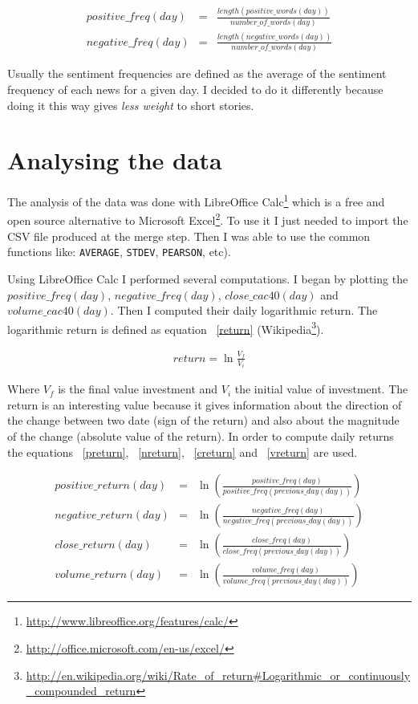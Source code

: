 \documentclass[12pt]{report}
\begin{document}
\begin{eqnarray}
	positive\_freq(day) &=& \frac{length(positive\_words(day))}{number\_of\_words(day)}\label{pfreq}\\
			 negative\_freq(day) &=& \frac{length(negative\_words(day))}{number\_of\_words(day)}\label{nfreq}
\end{eqnarray}

Usually the sentiment frequencies are defined as the average of the sentiment frequency of each news for a given day. I decided to do it differently because doing it this way gives \emph{less weight} to short stories.

\section{Analysing the data}

The analysis of the data was done with LibreOffice Calc\footnote{\url{http://www.libreoffice.org/features/calc/}} which is a free and open source alternative to Microsoft Excel\footnote{\url{http://office.microsoft.com/en-us/excel/}}. To use it I just needed to import the  CSV file produced at the merge step. Then I was able to use the common functions like: \lstinline!AVERAGE!, \lstinline!STDEV!, \lstinline!PEARSON!, etc).

Using LibreOffice Calc I performed several computations. I began by plotting the $positive\_freq(day)$, $negative\_freq(day)$, $close\_cac40(day)$ and $volume\_cac40(day)$. Then I computed their daily logarithmic return. The logarithmic return is defined as equation ~\ref{return}  (Wikipedia\footnote{\url{http://en.wikipedia.org/wiki/Rate_of_return\#Logarithmic_or_continuously_compounded_return}}).

\begin{eqnarray}
	return = \ln\frac{V_f}{V_i}\label{return}
\end{eqnarray}

Where $V_f$ is the final value investment and $V_i$ the initial value of investment. The return is an interesting value because it gives information about the direction of the change between two date (sign of the return) and also about the magnitude of the change (absolute value of the return). In order to compute daily returns the equations ~\ref{preturn}, ~\ref{nreturn}, ~\ref{creturn} and ~\ref{vreturn} are used.

\begin{eqnarray}
	positive\_return(day) &=& \ln\left(\frac{positive\_freq(day)}{positive\_freq(previous\_day(day))}\right)\label{preturn}\\
			 negative\_return(day) &=& \ln\left(\frac{negative\_freq(day)}{negative\_freq(previous\_day(day))}\right)\label{nreturn}\\
				   close\_return(day) &=& \ln\left(\frac{close\_freq(day)}{close\_freq(previous\_day(day))}\right)\label{creturn}\\
				  volume\_return(day) &=& \ln\left(\frac{volume\_freq(day)}{volume\_freq(previous\_day(day))}\right)\label{vreturn}
\end{eqnarray}
\end{document}

